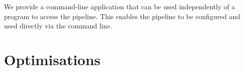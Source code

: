 \documentclass[sigconf]{acmart}
\begin{document}
We provide a command-line application that can be used independently of a program to access the pipeline. This enables the pipeline to be configured and used directly via the command line. 

\section{Optimisations}
\label{sec:optimisation}

\end{document}
